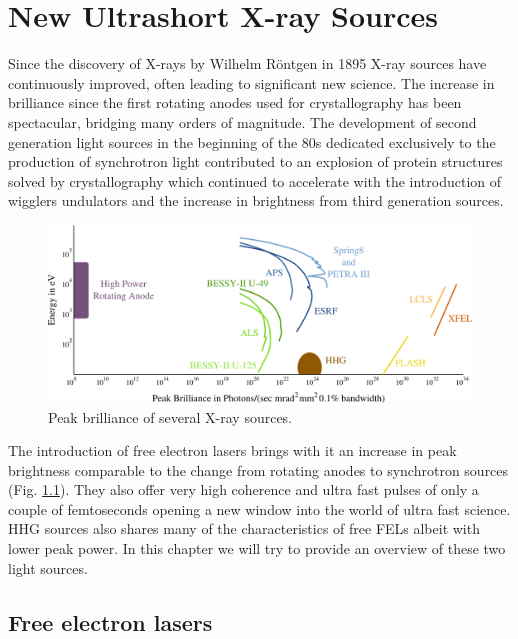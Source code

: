 \chapter{New Ultrashort X-ray Sources}\label{Ultrashort X-ray Sources}\noindent
 
Since the discovery of X-rays by Wilhelm R\"{o}ntgen in 1895 X-ray sources have
continuously improved, often leading to significant new science. The increase in
brilliance since the first rotating anodes used for crystallography has been
spectacular, bridging many orders of magnitude. The development of second
generation light sources in the beginning of the 80s dedicated exclusively to
the production of synchrotron light contributed to an explosion of
protein structures solved by crystallography which continued to accelerate with
the introduction of wigglers undulators and the increase in brightness from
third generation sources.

 
\begin{figure}[h]
\centering
  \includegraphics[width=1.0 \columnwidth]{brilliance.png}
  \caption{Peak brilliance of several X-ray sources.}
  \label{Fig:Brilliance}
\end{figure}

The introduction of free electron lasers brings with it an increase in peak
brightness comparable to the change from rotating anodes to synchrotron sources
(Fig. \ref{Fig:Brilliance}). They also offer very high coherence and ultra fast
pulses of only a couple of femtoseconds opening a new window into the world of
ultra fast science. HHG sources also shares many of the characteristics of free
FELs albeit with lower peak power. In this chapter we will try to provide an
overview of these two light sources.

\section{Free electron lasers}

